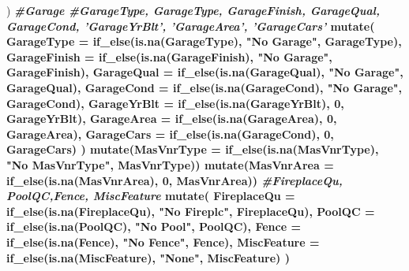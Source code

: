 \documentclass[
]{article}
\newenvironment{Shaded}{\begin{snugshade}}{\end{snugshade}}
\newcommand{\CommentTok}[1]{\textcolor[rgb]{0.56,0.35,0.01}{\textit{#1}}}
\newcommand{\DataTypeTok}[1]{\textcolor[rgb]{0.13,0.29,0.53}{#1}}
\newcommand{\DecValTok}[1]{\textcolor[rgb]{0.00,0.00,0.81}{#1}}
\newcommand{\KeywordTok}[1]{\textcolor[rgb]{0.13,0.29,0.53}{\textbf{#1}}}
\newcommand{\NormalTok}[1]{#1}
\newcommand{\OperatorTok}[1]{\textcolor[rgb]{0.81,0.36,0.00}{\textbf{#1}}}
\newcommand{\StringTok}[1]{\textcolor[rgb]{0.31,0.60,0.02}{#1}}
\begin{document}
\begin{Shaded}
\begin{Highlighting}[]
{{{\NormalTok{  ) }\OperatorTok{%>%}
\StringTok{  }
\StringTok{  }\CommentTok{#Garage}
\StringTok{  }\CommentTok{#GarageType, GarageType, GarageFinish, GarageQual, GarageCond, 'GarageYrBlt', 'GarageArea', 'GarageCars'}
\StringTok{  }\KeywordTok{mutate}\NormalTok{(}
    \DataTypeTok{GarageType =} \KeywordTok{if_else}\NormalTok{(}\KeywordTok{is.na}\NormalTok{(GarageType), }\StringTok{"No Garage"}\NormalTok{, GarageType),}
    \DataTypeTok{GarageFinish =}  \KeywordTok{if_else}\NormalTok{(}\KeywordTok{is.na}\NormalTok{(GarageFinish), }\StringTok{"No Garage"}\NormalTok{, GarageFinish),}
    \DataTypeTok{GarageQual =} \KeywordTok{if_else}\NormalTok{(}\KeywordTok{is.na}\NormalTok{(GarageQual), }\StringTok{"No Garage"}\NormalTok{, GarageQual),}
    \DataTypeTok{GarageCond =}  \KeywordTok{if_else}\NormalTok{(}\KeywordTok{is.na}\NormalTok{(GarageCond), }\StringTok{"No Garage"}\NormalTok{, GarageCond),}
    \DataTypeTok{GarageYrBlt =}  \KeywordTok{if_else}\NormalTok{(}\KeywordTok{is.na}\NormalTok{(GarageYrBlt), }\DecValTok{0}\NormalTok{, GarageYrBlt),}
    \DataTypeTok{GarageArea =}  \KeywordTok{if_else}\NormalTok{(}\KeywordTok{is.na}\NormalTok{(GarageArea), }\DecValTok{0}\NormalTok{, GarageArea),}
    \DataTypeTok{GarageCars =}  \KeywordTok{if_else}\NormalTok{(}\KeywordTok{is.na}\NormalTok{(GarageCond), }\DecValTok{0}\NormalTok{, GarageCars)}
\NormalTok{  ) }\OperatorTok{%>%}
\StringTok{  }
\StringTok{  }\KeywordTok{mutate}\NormalTok{(}\DataTypeTok{MasVnrType =} \KeywordTok{if_else}\NormalTok{(}\KeywordTok{is.na}\NormalTok{(MasVnrType), }\StringTok{"No MasVnrType"}\NormalTok{, MasVnrType)) }\OperatorTok{%>%}
\StringTok{  }\KeywordTok{mutate}\NormalTok{(}\DataTypeTok{MasVnrArea =} \KeywordTok{if_else}\NormalTok{(}\KeywordTok{is.na}\NormalTok{(MasVnrArea), }\DecValTok{0}\NormalTok{, MasVnrArea)) }\OperatorTok{%>%}
\StringTok{  }
\StringTok{  }
\StringTok{  }\CommentTok{#FireplaceQu, PoolQC,Fence, MiscFeature}
\StringTok{  }\KeywordTok{mutate}\NormalTok{(}
    \DataTypeTok{FireplaceQu =} \KeywordTok{if_else}\NormalTok{(}\KeywordTok{is.na}\NormalTok{(FireplaceQu), }\StringTok{"No Fireplc"}\NormalTok{, FireplaceQu),}
    \DataTypeTok{PoolQC =}  \KeywordTok{if_else}\NormalTok{(}\KeywordTok{is.na}\NormalTok{(PoolQC), }\StringTok{"No Pool"}\NormalTok{, PoolQC),}
    \DataTypeTok{Fence =} \KeywordTok{if_else}\NormalTok{(}\KeywordTok{is.na}\NormalTok{(Fence), }\StringTok{"No Fence"}\NormalTok{, Fence),}
    \DataTypeTok{MiscFeature =}  \KeywordTok{if_else}\NormalTok{(}\KeywordTok{is.na}\NormalTok{(MiscFeature), }\StringTok{"None"}\NormalTok{, MiscFeature)}
\NormalTok{  ) }\OperatorTok{%>%}
}}}}}}}}
\end{Highlighting}
\end{Shaded}
\end{document}
